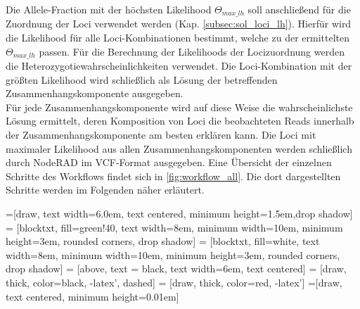 Die Allele-Fraction mit der höchsten Likelihood $\Theta_{max\_lh}$ soll anschließend für die Zuordnung der Loci verwendet werden (Kap. \ref{subsec:sol_loci_lh}). Hierfür wird die Likelihood für alle Loci-Kombinationen bestimmt, welche zu der ermittelten $\Theta_{max\_lh}$ passen. Für die Berechnung der Likelihoods der Locizuordnung werden die Heterozygotiewahrscheinlichkeiten verwendet. Die Loci-Kombination mit der größten Likelihood wird schließlich als Lösung der betreffenden Zusammenhangskomponente ausgegeben.\\

Für jede Zusammenhangskomponente wird auf diese Weise die wahrscheinlichste Lösung ermittelt, deren Komposition von Loci die beobachteten Reads innerhalb der Zusammenhangskomponente am besten erklären kann. Die Loci mit maximaler Likelihood aus allen Zusammenhangskomponenten werden schließlich durch NodeRAD im VCF-Format ausgegeben. Eine Übersicht der einzelnen Schritte des Workflows findet sich in \autoref{fig:workflow_all}. Die dort dargestellten Schritte werden im Folgenden näher erläutert. \\

\usetikzlibrary{shadows,arrows}

=[draw, text width=6.0em, text centered,
minimum height=1.5em,drop shadow]
 = [blocktxt, fill=green!40, text width=8em, minimum width=10em,
minimum height=3em, rounded corners, drop shadow]
 = [blocktxt, fill=white, text width=8em, minimum width=10em,
minimum height=3em, rounded corners, drop shadow]
 = [above, text = black, text width=6em, text centered]
 = [draw, thick, color=black, -latex', dashed]
 = [draw, thick, color=red, -latex']
=[draw, text centered, minimum height=0.01em]

\newcommand{\blockdist}{1.3}
\newcommand{\edgedist}{1.5}

\newcommand{\blockitem}[2]{node (p#1) [blockitem]
	{\textbf{\textit{#2}}}}

\newcommand{\ioitem}[2]{node (p#1) [ioitem]
	{\textbf{\textit{#2}}}}

\newcommand{\bond}[3]{
	\draw[very thick, #1] (#3, 0) -- (#3, 0.35);
	\draw[very thick, densely dotted] (#3, 0.35) -- (#3, 0.65);
	\draw[very thick, #2] (#3, 0.65) -- (#3, 1);
}
\newcommand{\background}[5]{%
	\begin{pgfonlayer}{background}
		\path (#1.west |- #2.north)+(-3.3,0.3) node (a1) {};
		\path (#3.east |- #4.south)+(+0.5,-0.25) node (a2) {};
		\path[fill=blue!20,rounded corners, draw=black]
		(a1) rectangle (a2);
		\path (a1.east |- a1.south) +(-3.0,-1.0) node (u1)[sectiontxt]
		{\textbf{\textit{#5}}};
\end{pgfonlayer}}

